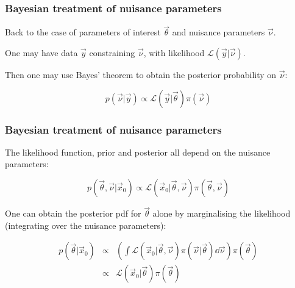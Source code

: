 \documentclass[9pt]{beamer}
\newif\ifmyhide
\newcommand\myhide[1]{%
\ifmyhide \vspace{15pt} \begin{center} \myexample{(blackboard)}\end{center} \vspace{15pt} \else #1 \fi
}
\begin{document}
\begin{frame}
 \frametitle{Bayesian treatment of nuisance parameters}
 
 Back to the case of parameters of interest $\vec{\theta}$ and nuisance parameters $\vec{\nu}$. 
 
 One may have data $\vec{y}$ constraining $\vec{\nu}$, with likelihood $\mathcal{L}(\vec{y}|\vec{\nu})$.
 
 Then one may use Bayes' theorem to obtain the posterior probability on $\vec{\nu}$: 
 
 $$p(\vec{\nu}|\vec{y}) \propto \mathcal{L}(\vec{y}|\vec{\theta}) \pi(\vec{\nu})$$
 

\end{frame}

\begin{frame}
 \frametitle{Bayesian treatment of nuisance parameters}
 
 The likelihood function, prior and posterior all depend on the nuisance parameters:
 
 \myhide{$$p(\vec{\theta},\vec{\nu} | \vec{x}_0) \propto \mathcal{L}(\vec{x}_0|\vec{\theta},\vec{\nu}) \pi(\vec{\theta},\vec{\nu})$$}
 
 One can obtain the posterior pdf for $\vec{\theta}$ alone by marginalising the likelihood (integrating over the nuisance parameters):
 
 \myhide{\begin{eqnarray}
          p(\vec{\theta} | \vec{x}_0) & \propto & \left(\int \mathcal{L}(\vec{x}_0|\vec{\theta},\vec{\nu}) \pi(\vec{\nu} | \vec{\theta}) \dd \vec{\nu}\right) \pi(\vec{\theta}) \nonumber \\
           & \propto & \mathcal{L}(\vec{x}_0|\vec{\theta}) \pi(\vec{\theta}) \nonumber
         \end{eqnarray}}
\end{frame}
\end{document}
